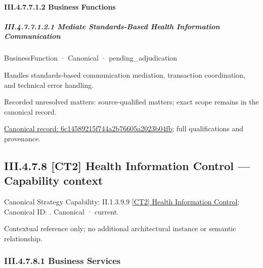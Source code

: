\paragraph*{III.4.7.7.1.2 Business Functions}
\label{navigation:III.4.7.7.1.2}

\subparagraph*{III.4.7.7.1.2.1 Mediate Standards-Based Health Information Communication}
\label{navigation:III.4.7.7.1.2.1}

\label{element:6c14589215f744a2b76605a2023b04fb}
{\small BusinessFunction · Canonical · pending\_adjudication}\par

Handles standards-based communication mediation, transaction coordination, and technical error handling.


{\small Recorded unresolved matters: source-qualified matters; exact scope remains in the canonical record.}\par
{\footnotesize \href{../../../../../../../continuum/business/business-function/6c14589215f744a2b76605a2023b04fb.md}{Canonical record: 6c14589215f744a2b76605a2023b04fb}; full qualifications and provenance.}\par
\subsection*{III.4.7.8 [CT2] Health Information Control — Capability context}
\label{navigation:III.4.7.8}

{\small Canonical Strategy Capability: II.1.3.9.9 \hyperref[element:44cc0e17ad534675bf26dce6e46a68ff]{[CT2] Health Information Control}; Canonical ID: \texttt{}. Canonical · current.}\par
Contextual reference only; no additional architectural instance or semantic relationship.\par
\subsubsection*{III.4.7.8.1 Business Services}
\label{navigation:III.4.7.8.1}

